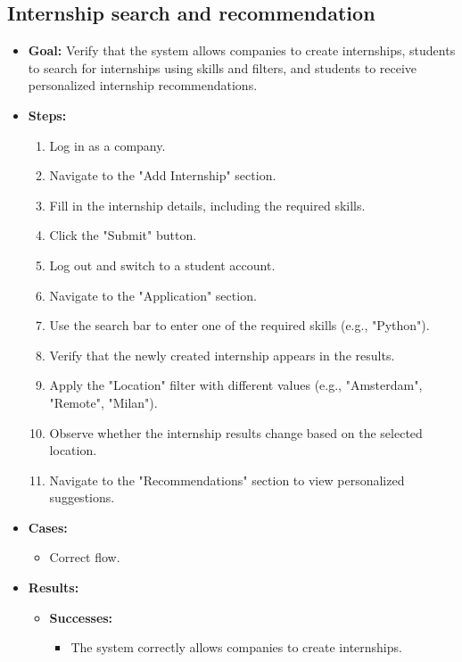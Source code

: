 \subsection{Internship search and recommendation}
\begin{itemize}
    \item \textbf{Goal:} Verify that the system allows companies to create internships, students to search for internships
        using skills and filters, and students to receive personalized internship recommendations.

    \item \textbf{Steps:}
    \begin{enumerate}
        \item Log in as a company.
        \item Navigate to the "Add Internship" section.
        \item Fill in the internship details, including the required skills.
        \item Click the "Submit" button.
        \item Log out and switch to a student account.
        \item Navigate to the "Application" section.
        \item Use the search bar to enter one of the required skills (e.g., "Python").
        \item Verify that the newly created internship appears in the results.
        \item Apply the "Location" filter with different values (e.g., "Amsterdam", "Remote", "Milan").
        \item Observe whether the internship results change based on the selected location.
        \item Navigate to the "Recommendations" section to view personalized suggestions.
    \end{enumerate}
    \item \textbf{Cases:}
    \begin{itemize}
        \item Correct flow.
    \end{itemize}
    \item \textbf{Results:}
    \begin{itemize}
        \item \textbf{Successes:}
        \begin{itemize}
            \item The system correctly allows companies to create internships.

\end{itemize}
\end{itemize}
\end{itemize}
